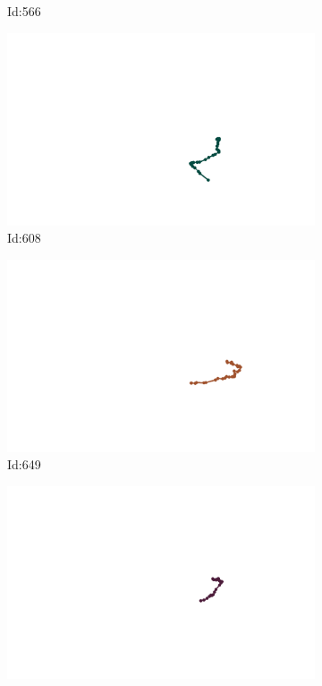 \documentclass[12pt,twoside]{report}
\begin{document}
\begin{figure}
\begin{subfigure}[b]{0.20\textwidth}
\caption{Id:566}
\end{subfigure}
\begin{subfigure}[b]{0.20\textwidth}
\centering
\includegraphics[width=\textwidth]{../trajectories/608.png}
\caption{Id:608}
\end{subfigure}
\begin{subfigure}[b]{0.20\textwidth}
\centering
\includegraphics[width=\textwidth]{../trajectories/649.png}
\caption{Id:649}
\end{subfigure}
\begin{subfigure}[b]{0.20\textwidth}
\centering
\includegraphics[width=\textwidth]{../trajectories/669.png}

\end{subfigure}
\end{figure}
\end{document}
